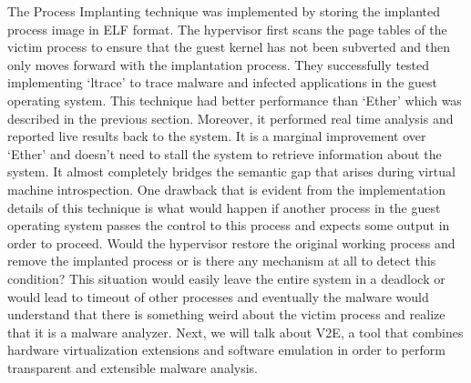 \documentclass[11pt]{article}
\begin{document}
	The Process Implanting technique was implemented by storing the implanted process image in ELF format. The hypervisor first scans the page tables of the victim process to ensure that the guest kernel has not been subverted and then only moves forward with the implantation process. They successfully tested implementing ‘ltrace’ to trace malware and infected applications in the guest operating system.
	This technique had better performance than ‘Ether’ which was described in the previous section. Moreover, it performed real time analysis and reported live results back to the system. It is a marginal improvement over ‘Ether’ and doesn’t need to stall the system to retrieve information about the system. It almost completely bridges the semantic gap that arises during virtual machine introspection. One drawback that is evident from the implementation details of this technique is what would happen if another process in the guest operating system passes the control to this process and expects some output in order to proceed. Would the hypervisor restore the original working process and remove the implanted process or is there any mechanism at all to detect this condition? This situation would easily leave the entire system in a deadlock or would lead to timeout of other processes and eventually the malware would understand that there is something weird about the victim process and realize that it is a malware analyzer. Next, we will talk about V2E, a tool that combines hardware virtualization extensions and software emulation in order to perform transparent and extensible malware analysis. 
	
\end{document}
